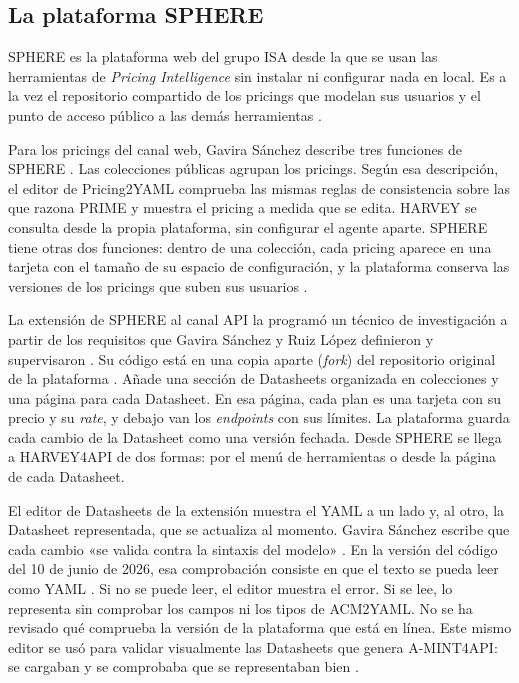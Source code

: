 \subsection{La plataforma SPHERE}
\label{sec:estado:sphere}

SPHERE es la plataforma web del grupo ISA desde la que se usan las
herramientas de \textit{Pricing Intelligence} sin instalar ni configurar
nada en local. Es a la vez el repositorio compartido de los pricings que
modelan sus usuarios y el punto de acceso público a las demás
herramientas \citep{sphere,gavira2026tfm}.

Para los pricings del canal web, Gavira Sánchez describe tres funciones
de SPHERE \citep{gavira2026tfm}. Las colecciones públicas agrupan los
pricings. Según esa descripción, el editor de Pricing2YAML comprueba las
mismas reglas de consistencia sobre las que razona PRIME y muestra el
pricing a medida que se edita. HARVEY se consulta desde la propia
plataforma, sin configurar el agente aparte. SPHERE tiene otras dos
funciones: dentro de una colección, cada pricing aparece en una tarjeta
con el tamaño de su espacio de configuración, y la plataforma conserva
las versiones de los pricings que suben sus usuarios \citep{sphere}.

La extensión de SPHERE al canal API la programó un técnico de
investigación a partir de los requisitos que Gavira Sánchez y Ruiz López
definieron y supervisaron \citep{gavira2026tfm}. Su código está en una
copia aparte (\textit{fork}) del repositorio original de la plataforma
\citep{sphereapitaskforce}. Añade una sección de Datasheets organizada en
colecciones y una página para cada Datasheet. En esa página, cada plan es
una tarjeta con su precio y su \textit{rate}, y debajo van los
\textit{endpoints} con sus límites. La plataforma guarda cada cambio de la
Datasheet como una versión fechada. Desde SPHERE se llega a HARVEY4API de
dos formas: por el menú de herramientas o desde la página de cada
Datasheet.

El editor de Datasheets de la extensión muestra el YAML a un lado y, al
otro, la Datasheet representada, que se actualiza al momento. Gavira
Sánchez escribe que cada cambio «se valida contra la sintaxis del modelo»
\citep{gavira2026tfm}. En la versión del código del 10 de junio de 2026,
esa comprobación consiste en que el texto se pueda leer como YAML
\citep{sphereapitaskforce}. Si no se puede leer, el editor muestra el
error. Si se lee, lo representa sin comprobar los campos ni los tipos de
ACM2YAML. No se ha revisado qué comprueba la versión de la plataforma que
está en línea. Este mismo editor se usó para validar visualmente las
Datasheets que genera A-MINT4API: se cargaban y se comprobaba que se
representaban bien \citep{gavira2026tfm}.

